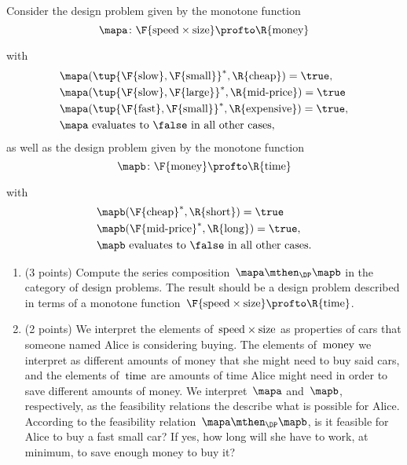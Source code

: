 \documentclass[paper=8.125in:10.250in,pagesize=pdftex,
    headinclude=false,footinclude=false,oneside,egregdoesnotlikesansseriftitles]{kaobook}
\begin{document}
\begin{gradedexercise}
Consider the design problem given by the monotone function 
\begin{equation}
\mapa\colon \F{\speed \times \size}\profto \R{\money}
\end{equation}
\begin{center}
\end{center}
with 
\begin{align*}
&\mapa(\tup{ \F{\slow}, \F{\ssmall}}^*, \R{\cheap}) = \true, \\
&\mapa(\tup{ \F{\slow}, \F{\llarge}}^*, \R{\midprice}) = \true \\
&\mapa(\tup{ \F{\fast}, \F{\ssmall}}^*, \R{\expensive}) =  \true, \\
&\mapa \text{ evaluates to } \false \text{ in all other cases},
\end{align*}
as well as the design problem given by the monotone function 
\begin{equation}
\mapb\colon \F{\money} \profto \R{\ttime}
\end{equation}
\begin{center}
\end{center}
with 
\begin{align*}
&\mapb( \F{\cheap}^*, \R{\sshort}) = \true \\
&\mapb(\F{\midprice}^*, \R{\llong}) = \true, \\
&\mapb \text{ evaluates to } \false \text{ in all other cases}.
\end{align*}

\begin{enumerate} 
\item (3 points) Compute the series composition~$\mapa \mthen_\DP \mapb$ in the category of design problems.
The result should be a design problem described in terms of a monotone function~$\F{\speed \times \size} \profto \R{\ttime}$.
\item (2 points) We interpret the elements of~$\text{speed} \times \text{size}$ as properties of cars that someone named Alice is considering buying.
The elements of~$\text{money}$ we interpret as different amounts of money that she might need to buy said cars, and the elements of~$\text{time}$ are amounts of time Alice might need in order to save different amounts of money.
We interpret~$\mapa$ and~$\mapb$, respectively, as the feasibility relations the describe what is possible for Alice.
According to the feasibility relation~$\mapa \mthen_\DP \mapb$, is it feasible for Alice to buy a fast small car?
If yes, how long will she have to work, at minimum, to save enough money to buy it?
\end{enumerate}
\end{gradedexercise}


\newpage
\end{document}
